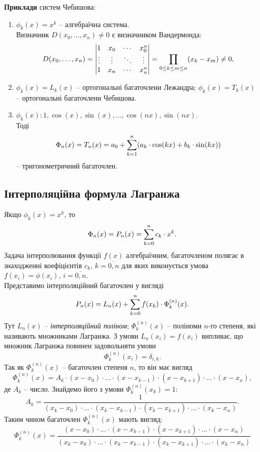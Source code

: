 \textbf{Приклади} систем Чебишова:
\begin{enumerate}
    \item $\phi_k(x) = x^k$ -- алгебраїчна система. \\
    
    Визначник $D(x_0, \ldots, x_n) \ne 0$ є визначником Вандермонда:
    \[ D(x_0, \ldots, x_n) = \begin{vmatrix} 1 & x_0 & \cdots & x_0^n \\ \vdots & \vdots & \ddots & \vdots \\ 1 & x_n & \cdots & x_n^n \end{vmatrix} = \displaystyle\prod\limits_{0 \le k \le m \le n} (x_k - x_m) \ne 0, \]
    
    \item $\phi_k (x) = L_k(x)$ -- ортогональні багаточлени Лежандра; $\phi_k(x) = T_k(x)$ -- ортогональні багаточлени Чебишова.

    \item$\phi_k(x): 1, \cos(x), \sin(x), \ldots, \cos(nx), \sin(nx)$.\\
    
    Тоді \[\Phi_n(x) = T_n(x) = a_0 + \displaystyle\sum\limits_{k=1}^n(a_k\cdot\cos(kx) + b_k\cdot\sin(kx))\] -- тригонометричний багаточлен.
\end{enumerate}

\subsection{Інтерполяційна формула Лагранжа}
Якщо $\phi_k(x) = x^k$, то \[\Phi_n(x) = P_n(x) = \displaystyle\sum\limits_{k=0}^n c_k \cdot x^k.\] Задача інтерполювання функції $f(x)$ алгебраїчним, багаточленом полягає в знаходженні коефіцієнтів $c_k$, $k = \overline{0,n}$ для яких виконується умова $f(x_i) = \phi(x_i)$, $i = \overline{0, n}$. \\

Представимо інтерполяційний багаточлен у вигляді
\begin{equation}
    \label{eq:6.3}
    P_n(x) = L_n(x) + \displaystyle\sum\limits_{k=0}^n f(x_k)\cdot\Phi_k^{(n)}(x).
\end{equation}
Тут $L_n(x)$ -- \textit{інтерполяційний поліном}; $\Phi_k^{(n)}(x)$ -- поліноми $n$-го степеня, які називають множниками Лагранжа. З умови $L_n(x_i)=f(x_i)$ випливає, що множник Лагранжа повинен задовольняти умови
\begin{equation}
    \label{eq:6.4}
    \Phi_k^{(n)} (x_i) = \delta_{i,k}.
\end{equation}
Так як $\Phi_k^{(n)}(x)$ -- багаточлен степеня $n$, то він має вигляд 
\[ \Phi_k^{(n)}(x) = A_k\cdot(x-x_0)\cdot\ldots\cdot(x-x_{k-1})\cdot(x-x_{k+1})\cdot\ldots\cdot(x-x_n), \]
де $A_k$ -- число. Знайдемо його з умови $\Phi_k^{(n)}(x_k) = 1$:
\[ A_k = \dfrac{1}{(x_k-x_0)\cdot\ldots\cdot(x_k-x_{k-1})\cdot(x_k-x_{k+1})\cdot\ldots\cdot(x_k-x_n)}. \]
Таким чином багаточлен $\Phi_k^{(n)}(x)$ мають вигляд:
\begin{equation}
    \label{eq:6.5}
    \Phi_k^{(n)} (x) = \dfrac{(x-x_0)\cdot\ldots\cdot(x-x_{k-1})\cdot(x-x_{k+1})\cdot\ldots\cdot(x-x_n)}{(x_k-x_0)\cdot\ldots\cdot(x_k-x_{k-1})\cdot(x_k-x_{k+1})\cdot\ldots\cdot(x_k-x_n)}
\end{equation}


